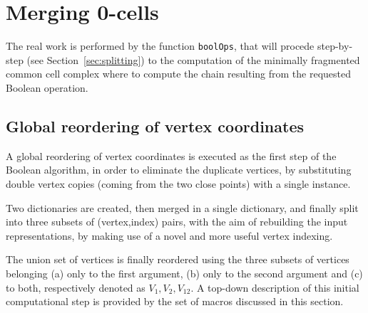 \documentclass[11pt,oneside]{article}	%
\begin{document}
\section{Merging 0-cells}

The real work is performed by the function \texttt{boolOps}, that will procede step-by-step (see Section~\ref{sec:splitting}) to the computation of the minimally fragmented common cell complex where to compute the chain resulting from the requested Boolean operation.

\subsection{Global reordering of vertex coordinates}
A global reordering of vertex coordinates is executed as the first step of the Boolean algorithm, in order to eliminate the duplicate vertices, by substituting double vertex copies (coming from the two close points) with a single instance. 

Two dictionaries are created, then merged in a single dictionary, and finally split into three subsets of (vertex,index) pairs, with the aim of rebuilding the input representations, by making use of a novel and more useful vertex indexing.

The union set of vertices is finally reordered using the three subsets of vertices belonging (a) only to the first argument, (b) only to the second argument and (c) to both, respectively denoted as $V_1, V_2, V_{12}$. A top-down description of this initial computational step is provided by the set of macros discussed in this section.
\end{document}
